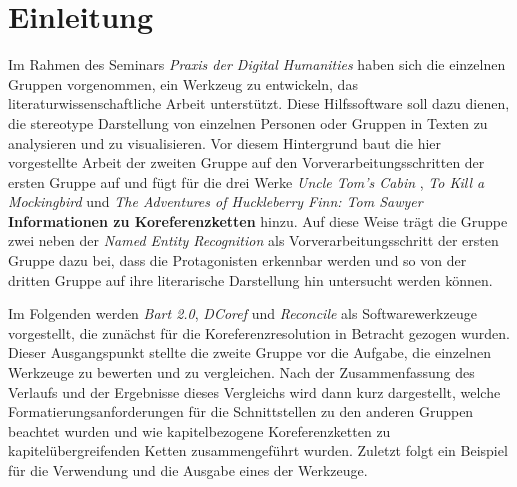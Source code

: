 \documentclass[a4paper,12pt,titlepage=true, ngerman]{scrartcl}
\begin{document}



\newpage

\listoffigures



\newpage

\listoftables


\newpage
{}

\section{Einleitung}\label{Einleitung} %
 
Im Rahmen des Seminars \emph{Praxis der Digital Humanities} haben sich die einzelnen Gruppen vorgenommen, ein Werkzeug zu entwickeln, das literaturwissenschaftliche Arbeit unterstützt. Diese Hilfssoftware soll dazu dienen, die stereotype Darstellung von einzelnen Personen oder Gruppen in Texten zu analysieren und zu visualisieren. Vor diesem Hintergrund baut die hier vorgestellte Arbeit der zweiten Gruppe auf den Vorverarbeitungsschritten der ersten Gruppe auf und fügt für die drei Werke \emph{Uncle Tom's Cabin}  \autocite[]{chris_uncle}, \emph{To Kill a Mockingbird}  \autocite[]{chris_bird} und \emph{The Adventures of Huckleberry Finn: Tom Sawyer} \autocite[]{chris_adventures} \textbf{Informationen zu Koreferenzketten} hinzu. Auf diese Weise trägt die Gruppe zwei neben der \emph{Named Entity Recognition} als Vorverarbeitungsschritt der ersten Gruppe dazu bei, dass die Protagonisten erkennbar werden und so von der dritten Gruppe auf ihre literarische Darstellung hin untersucht werden können.

Im Folgenden werden \emph{Bart 2.0}, \emph{DCoref} und \emph{Reconcile} als Softwarewerkzeuge vorgestellt, die zunächst für die Koreferenzresolution in Betracht gezogen wurden. Dieser Ausgangspunkt stellte die zweite Gruppe vor die Aufgabe, die einzelnen Werkzeuge zu bewerten und zu vergleichen. Nach der Zusammenfassung des Verlaufs und der Ergebnisse dieses Vergleichs wird dann kurz dargestellt, welche Formatierungsanforderungen für die Schnittstellen zu den anderen Gruppen beachtet wurden und wie kapitelbezogene Koreferenzketten zu kapitelübergreifenden Ketten zusammengeführt wurden. Zuletzt folgt ein Beispiel für die Verwendung und die Ausgabe eines der Werkzeuge.
\end{document}
